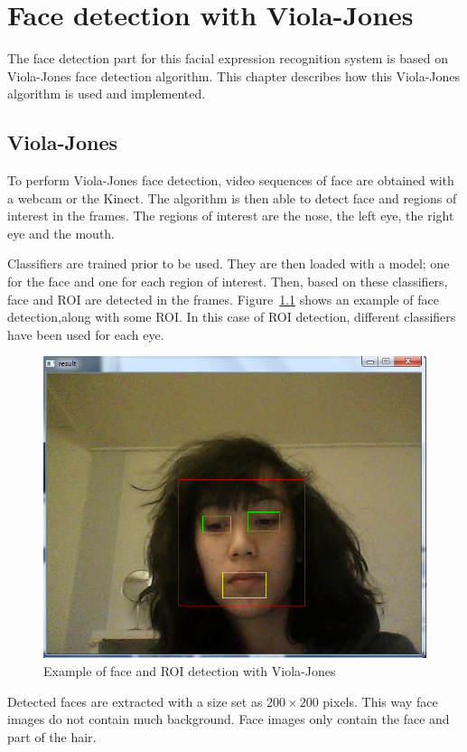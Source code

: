 \chapter{Face detection with Viola-Jones}
\label{chap:implementation_violajones}

\noindent The face detection part for this facial expression recognition system is based on Viola-Jones face detection algorithm. This chapter describes how this Viola-Jones algorithm is used and implemented.
\newline

\section{Viola-Jones}

\vspace{\baselineskip}
\noindent To perform Viola-Jones face detection, video sequences of face are obtained with a webcam or the Kinect. The algorithm is then able to detect face and regions of interest in the frames. The regions of interest are the nose, the left eye, the right eye and the mouth. 
\newline

\noindent Classifiers are trained prior to be used. They are then loaded with a model; one for the face and one for each region of interest. Then, based on these classifiers, face and ROI are detected in the frames. Figure~\ref{violajones_implementation_example} shows an example of face detection,along with some ROI. In this case of ROI detection, different classifiers have been used for each eye. 
\newline

\begin{figure}[!h]
\begin{center}
\noindent \includegraphics[scale=0.5]{figures/violajones_implementation_example} 
\newline
\caption{Example of face and ROI detection with Viola-Jones}
\label{violajones_implementation_example}
\end{center} 
\end{figure}

\noindent Detected faces are extracted with a size set as $ 200\times200 $ pixels. This way face images do not contain much background. Face images only contain the face and part of the hair.
\newline
